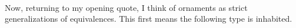 \documentclass{article}
\begin{document}
\begin{code}%
\>[0]\AgdaSpace{}%
\AgdaSymbol{:}\AgdaSpace{}%
\AgdaSymbol{\{}\AgdaSpace{}%
\AgdaSpace{}%
\AgdaSpace{}%
\AgdaSymbol{:}\AgdaSpace{}%
\AgdaSymbol{\}}\AgdaSpace{}%
\AgdaSymbol{(}\AgdaSpace{}%
\AgdaSymbol{:}\AgdaSpace{}%
\AgdaSpace{}%
\AgdaSymbol{)}\AgdaSpace{}%
\AgdaSpace{}%
\AgdaSymbol{(}\AgdaSpace{}%
\AgdaSymbol{:}\AgdaSpace{}%
\AgdaSpace{}%
\AgdaSymbol{)}\AgdaSpace{}%
\AgdaSpace{}%
\AgdaSpace{}%
\AgdaSymbol{(}\AgdaSpace{}%
\AgdaSpace{}%
\AgdaSpace{}%
\AgdaSpace{}%
\AgdaSpace{}%
\AgdaSymbol{)}\<%
\\
\>[0]\AgdaSpace{}%
\AgdaSymbol{\{}\AgdaSpace{}%
\AgdaSymbol{=}\AgdaSpace{}%
\AgdaSymbol{\}}\AgdaSpace{}%
\AgdaSpace{}%
\AgdaSpace{}%
\AgdaSymbol{=}\AgdaSpace{}%
\AgdaSpace{}%
\AgdaSymbol{(}\AgdaSpace{}%
\AgdaSpace{}%
\AgdaSymbol{)}\AgdaSpace{}%
\AgdaSpace{}%
\AgdaSpace{}%
\AgdaSpace{}%
\AgdaSpace{}%
\AgdaSymbol{(}\AgdaSpace{}%
\AgdaSpace{}%
\AgdaSymbol{)}\AgdaSpace{}%
\AgdaSymbol{)}\<%
\end{code}

Now, returning to my opening quote, I think of ornaments as strict
generalizations of equivalences. This first means the following type is inhabited.
\end{document}
